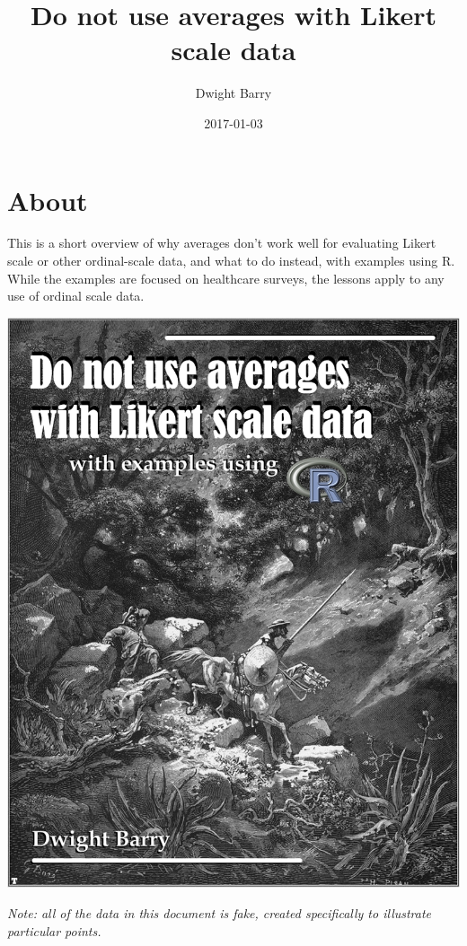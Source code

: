 \documentclass[]{book}
\title{Do not use averages with Likert scale data}
\author{Dwight Barry}
\date{2017-01-03}
\begin{document}
\maketitle

{
\setcounter{tocdepth}{1}
\tableofcontents
}
\chapter*{About}\label{about}

This is a short overview of why averages don't work well for evaluating
Likert scale or other ordinal-scale data, and what to do instead, with
examples using R. While the examples are focused on healthcare surveys,
the lessons apply to any use of ordinal scale data.

\begin{center}\includegraphics[width=11.35in]{images/likert_cover} \end{center}

\emph{Note: all of the data in this document is fake, created
specifically to illustrate particular points.}
\end{document}
